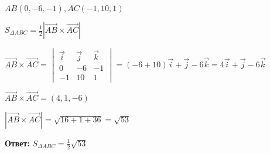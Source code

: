 $AB (0, -6, -1), AC (-1, 10, 1)$ 

$S_{\Delta ABC} = \frac{1}{2} |\vec{AB} \times \vec {AC}|$

$ \vec{AB} \times \vec{AC} = \begin{vmatrix}
                \vec i & \vec j & \vec k \\
                0 & -6 & -1 \\
                -1 & 10 & 1
            \end{vmatrix} =
(-6 + 10) \vec i + \vec j - 6 \vec k = 4 \vec i + \vec j - 6 \vec k$

$\vec{AB} \times \vec{AC} = (4, 1, -6)$ 

$|\vec{AB} \times \vec{AC}| = \sqrt{16 + 1 + 36} = \sqrt{53}$

\textbf{Ответ:} $S_{\Delta ABC} = \frac{1}{2} \sqrt{53}$
